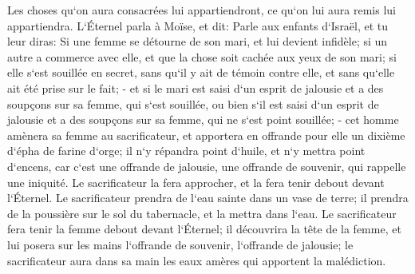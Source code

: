 \verse Les choses qu`on aura consacrées lui appartiendront, ce qu`on lui aura remis lui appartiendra. 
\verse L`Éternel parla à Moïse, et dit: 
\verse Parle aux enfants d`Israël, et tu leur diras: Si une femme se détourne de son mari, et lui devient infidèle; 
\verse si un autre a commerce avec elle, et que la chose soit cachée aux yeux de son mari; si elle s`est souillée en secret, sans qu`il y ait de témoin contre elle, et sans qu`elle ait été prise sur le fait; - 
\verse et si le mari est saisi d`un esprit de jalousie et a des soupçons sur sa femme, qui s`est souillée, ou bien s`il est saisi d`un esprit de jalousie et a des soupçons sur sa femme, qui ne s`est point souillée; - 
\verse cet homme amènera sa femme au sacrificateur, et apportera en offrande pour elle un dixième d`épha de farine d`orge; il n`y répandra point d`huile, et n`y mettra point d`encens, car c`est une offrande de jalousie, une offrande de souvenir, qui rappelle une iniquité. 
\verse Le sacrificateur la fera approcher, et la fera tenir debout devant l`Éternel. 
\verse Le sacrificateur prendra de l`eau sainte dans un vase de terre; il prendra de la poussière sur le sol du tabernacle, et la mettra dans l`eau. 
\verse Le sacrificateur fera tenir la femme debout devant l`Éternel; il découvrira la tête de la femme, et lui posera sur les mains l`offrande de souvenir, l`offrande de jalousie; le sacrificateur aura dans sa main les eaux amères qui apportent la malédiction. 
